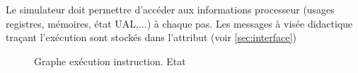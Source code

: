 Le simulateur doit permettre d'accéder aux informations processeur (usages registres, mémoires, état UAL,...) à chaque pas. Les messages à visée didactique traçant l'exécution sont stockés dans l'attribut  (voir \cref{sec:interface})

\begin{figure}
	\centering
	
	\caption{\label{fig:graphe_currentState}Graphe exécution instruction. Etat }
\end{figure}


 

\clearpage